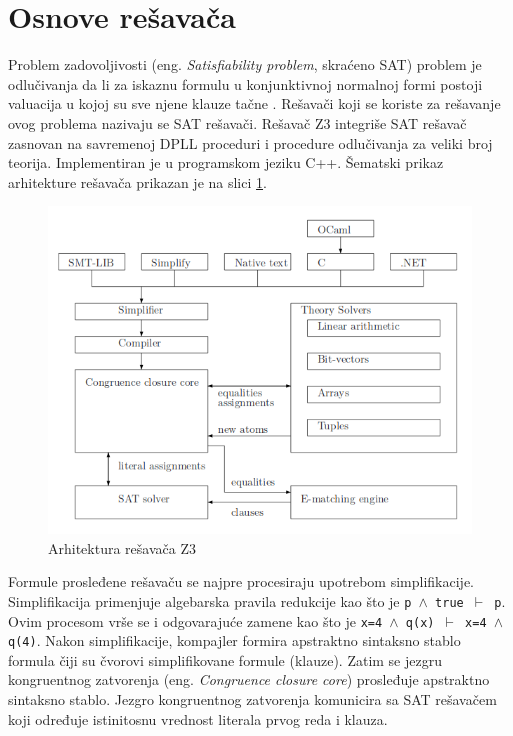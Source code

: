 \documentclass[12pt,oneside]{memoir}
\begin{document}
\section{Osnove rešavača}  \label{sec:num1}
Problem zadovoljivosti (eng. \textit{Satisfiability problem}, skraćeno SAT) problem je odlučivanja da li za iskaznu formulu u konjunktivnoj normalnoj formi postoji valuacija u kojoj su sve njene 
klauze tačne \cite{Handbook}. 
Rešavači koji se koriste za rešavanje ovog problema nazivaju se SAT rešavači. Rešavač Z3 integriše SAT rešavač zasnovan na savremenoj DPLL proceduri i procedure odlučivanja za veliki broj teorija.
Implementiran je u programskom jeziku C++. Šematski prikaz arhitekture rešavača \cite{EfficientSMTSolver} prikazan je na slici \ref{fig:arhitektura}. 
\begin{figure}[!ht]
  \centering
  \includegraphics[width=1\textwidth]{arhitektura.png}
  \caption{Arhitektura rešavača Z3}
  \label{fig:arhitektura}
\end{figure}
\par
Formule prosleđene rešavaču se najpre procesiraju upotrebom simplifikacije. Simplifikacija primenjuje algebarska pravila redukcije kao što je \texttt{p $\land$ true $\vdash$ p}. Ovim procesom vrše se i odgovarajuće zamene kao što je \texttt{x=4 $\land$ q(x) $\vdash$ x=4 $\land$ q(4)}.
Nakon simplifikacije, kompajler formira apstraktno sintaksno stablo formula čiji su čvorovi simplifikovane formule (klauze). Zatim se jezgru kongruentnog zatvorenja (eng. 
\textit{Congruence closure core}) prosleđuje apstraktno sintaksno stablo. Jezgro kongruentnog zatvorenja komunicira sa SAT rešavačem koji određuje istinitosnu vrednost literala prvog reda i klauza. 
\par
\end{document}
